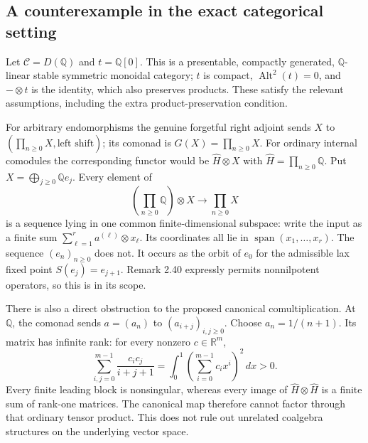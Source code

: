 \documentclass[10pt]{article}
\begin{document}
\subsection*{A counterexample in the exact categorical setting}
Let \(\mathcal C=D(\mathbb Q)\) and \(t=\mathbb Q[0]\). This is a presentable, compactly generated, \(\mathbb Q\)-linear stable symmetric monoidal category; \(t\) is compact, \(\operatorname{Alt}^2(t)=0\), and \(-\otimes t\) is the identity, which also preserves products. These satisfy the relevant assumptions, including the extra product-preservation condition.\par
For arbitrary endomorphisms the genuine forgetful right adjoint sends \(X\) to \((\prod_{n\ge0}X,\text{left shift})\); its comonad is \(G(X)=\prod_{n\ge0}X\). For ordinary internal comodules the corresponding functor would be \(\widehat H\otimes X\) with \(\widehat H=\prod_{n\ge0}\mathbb Q\). Put \(X=\bigoplus_{j\ge0}\mathbb Qe_j\). Every element of \[(\prod_{n\ge0}\mathbb Q)\otimes X\longrightarrow\prod_{n\ge0}X\] is a sequence lying in one common finite-dimensional subspace: write the input as a finite sum \(\sum_{\ell=1}^r a^{(\ell)}\otimes x_\ell\). Its coordinates all lie in \(\operatorname{span}(x_1,\ldots,x_r)\). The sequence \((e_n)_{n\ge0}\) does not. It occurs as the orbit of \(e_0\) for the admissible lax fixed point \(S(e_j)=e_{j+1}\). Remark 2.40 expressly permits nonnilpotent operators, so this is in its scope.\par
There is also a direct obstruction to the proposed canonical comultiplication. At \(\mathbb Q\), the comonad sends \(a=(a_n)\) to \((a_{i+j})_{i,j\ge0}\). Choose \(a_n=1/(n+1)\). Its matrix has infinite rank: for every nonzero \(c\in\mathbb R^m\), \[\sum_{i,j=0}^{m-1}\frac{c_i c_j}{i+j+1}
 =\int_0^1\left(\sum_{i=0}^{m-1}c_i x^i\right)^2\,dx>0.\] Every finite leading block is nonsingular, whereas every image of \(\widehat H\otimes\widehat H\) is a finite sum of rank-one matrices. The canonical map therefore cannot factor through that ordinary tensor product. This does not rule out unrelated coalgebra structures on the underlying vector space.\par
\end{document}
